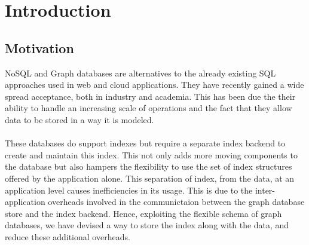 
\chapter{Introduction} %

\label{Chapter1} %


\newcommand{\keyword}[1]{\textbf{#1}}
\newcommand{\tabhead}[1]{\textbf{#1}}
\newcommand{\code}[1]{\texttt{#1}}
\newcommand{\file}[1]{\texttt{\bfseries#1}}
\newcommand{\option}[1]{\texttt{\itshape#1}}


\section{Motivation}
NoSQL and Graph databases are alternatives to the already existing SQL approaches used in web and cloud applications. They have recently gained a wide spread acceptance, both in industry and academia. This has been due the their ability to handle an increasing scale of operations and the fact that they allow data to be stored in a way it is modeled. \\
\\
These databases do support indexes but require a separate index backend to create and maintain this index. This not only adds more moving components to the database but also hampers the flexibility to use the set of index structures offered by the application alone. This separation of index, from the data, at an application level causes inefficiencies in its usage. This is due to the inter-application overheads involved in the communictaion between the graph database store and the index backend. Hence, exploiting the flexible schema of graph databases, we have devised a way to store the index along with the data, and reduce these additional overheads.


